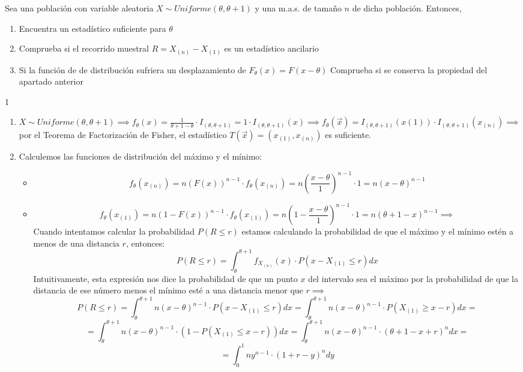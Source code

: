 \begin{problem}{2.7}
	Sea una población con variable aleatoria $X \sim Uniforme(\theta, \theta + 1)$ y una m.a.s. de tamaño $n$ de dicha población. Entonces, 
	\begin{enumerate}
		\item Encuentra un estadístico suficiente para $\theta$
		\item Comprueba si el recorrido muestral $R = X_{(n)} - X_{(1)}$ es un estadístico ancilario
		\item Si la función de de distribución sufriera un desplazamiento de $F_{\theta}(x) = F(x - \theta)$ Comprueba si se conserva la propiedad del apartado anterior
	\end{enumerate}
\end{problem}
\begin{sol}1
	\begin{enumerate}
		\item $X \sim Uniforme(\theta, \theta + 1) \implies f_{\theta}(x) = \frac{1}{\theta + 1 - \theta} \cdot I_{(\theta, \theta + 1)} = 1 \cdot I_{(\theta, \theta +1)}(x) \implies f_{\theta}(\vec{x}) = I_{(\theta, \theta + 1)}(x{(1)})\cdot I_{(\theta, \theta +1)}(x_{(n)})  \implies$ por el Teorema de Factorización de Fisher, el estadístico $T(\vec{x}) = (x_{(1)}, x_{(n)})$ es suficiente.
		\item Calculemos las funciones de distribución del máximo y el mínimo: 
		\begin{itemize}
			\item $$f_{\theta}(x_{(n)}) = n(F(x))^{n-1} \cdot f_{\theta}(x_{(n)}) = n\left(\frac{x - \theta}{1}\right)^{n-1} \cdot 1 = n(x - \theta)^{n-1}$$ 
			\item $$f_{\theta}(x_{(1)}) = n(1 - F(x))^{n-1} \cdot f_{\theta}(x_{(1)}) = n\left(1 - \frac{x - \theta}{1}\right)^{n-1} \cdot 1 = n(\theta + 1 - x)^{n-1} \implies$$
			Cuando intentamos calcular la probabilidad $P(R \leq r)$ estamos calculando la probabilidad de que el máximo y el mínimo estén a menos de una distancia $r$, entonces: 
			$$P(R \leq r) = \int_{\theta}^{\theta +1} f_{X_{(n)}}(x) \cdot P(x - X_{(1)} \leq r)dx$$
			Intuitivamente, esta expresión nos dice la probabilidad de que un punto $x$ del intervalo sea el máximo por la probabilidad de que la distancia de ese número menos el mínimo esté a una distancia menor que $r \implies$
			$$P(R \leq r) = \int_{\theta}^{\theta +1} n(x - \theta)^{n-1} \cdot P(x - X_{(1)} \leq r)dx = \int_{\theta}^{\theta +1} n(x - \theta)^{n-1} \cdot P(X_{(1)} \geq x - r)dx =$$ $$ = \int_{\theta}^{\theta +1} n(x - \theta)^{n-1} \cdot (1 - P(X_{(1)} \leq x - r))dx = \int_{\theta}^{\theta +1} n(x - \theta)^{n-1} \cdot (\theta + 1 - x + r)^n dx = $$ $$ = \int_{0}^{1} n y^{n-1}\cdot (1 + r - y)^{n}dy$$

\end{itemize}
\end{enumerate}
\end{sol}
